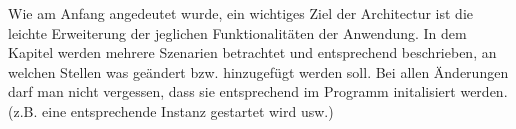 Wie am Anfang angedeutet wurde, ein wichtiges Ziel der Architectur ist die leichte Erweiterung der jeglichen Funktionalitäten der 
Anwendung. In dem Kapitel werden mehrere Szenarien betrachtet und entsprechend beschrieben, an welchen Stellen was geändert bzw.
hinzugefügt werden soll. Bei allen Änderungen darf man nicht vergessen, dass sie entsprechend im Programm initalisiert werden.
(z.B. eine entsprechende Instanz gestartet wird usw.)